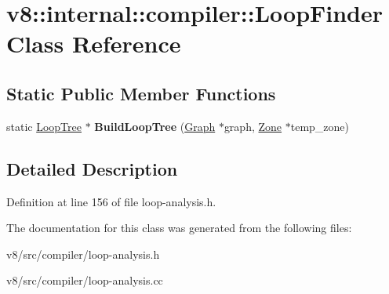 \hypertarget{classv8_1_1internal_1_1compiler_1_1LoopFinder}{}\section{v8\+:\+:internal\+:\+:compiler\+:\+:Loop\+Finder Class Reference}
\label{classv8_1_1internal_1_1compiler_1_1LoopFinder}
\subsection*{Static Public Member Functions}
\begin{DoxyCompactItemize}
\item 
\mbox{\label{classv8_1_1internal_1_1compiler_1_1LoopFinder_a632e27549ef62293a4a5f7817cf15738}} 
static \mbox{\hyperlink{classv8_1_1internal_1_1compiler_1_1LoopTree}{Loop\+Tree}} $\ast$ {\bfseries Build\+Loop\+Tree} (\mbox{\hyperlink{classv8_1_1internal_1_1compiler_1_1Graph}{Graph}} $\ast$graph, \mbox{\hyperlink{classv8_1_1internal_1_1Zone}{Zone}} $\ast$temp\+\_\+zone)
\end{DoxyCompactItemize}


\subsection{Detailed Description}


Definition at line 156 of file loop-\/analysis.\+h.



The documentation for this class was generated from the following files\+:\begin{DoxyCompactItemize}
\item 
v8/src/compiler/loop-\/analysis.\+h\item 
v8/src/compiler/loop-\/analysis.\+cc\end{DoxyCompactItemize}
